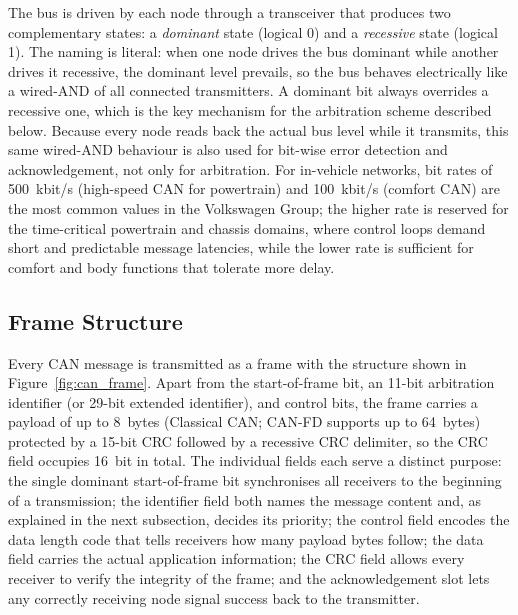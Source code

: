 \documentclass[11pt,a4paper,oneside,parskip=half]{scrreprt}
\begin{document}
The bus is driven by each node through a transceiver that produces two complementary states: a \textit{dominant} state (logical 0) and a \textit{recessive} state (logical 1). The naming is literal: when one node drives the bus dominant while another drives it recessive, the dominant level prevails, so the bus behaves electrically like a wired-AND of all connected transmitters. A dominant bit always overrides a recessive one, which is the key mechanism for the arbitration scheme described below. Because every node reads back the actual bus level while it transmits, this same wired-AND behaviour is also used for bit-wise error detection and acknowledgement, not only for arbitration. For in-vehicle networks, bit rates of 500~kbit/s (high-speed CAN for powertrain) and 100~kbit/s (comfort CAN) are the most common values in the Volkswagen Group; the higher rate is reserved for the time-critical powertrain and chassis domains, where control loops demand short and predictable message latencies, while the lower rate is sufficient for comfort and body functions that tolerate more delay.

\subsection{Frame Structure}
Every CAN message is transmitted as a frame with the structure shown in Figure~\ref{fig:can_frame}. Apart from the start-of-frame bit, an 11-bit arbitration identifier (or 29-bit extended identifier), and control bits, the frame carries a payload of up to 8~bytes (Classical CAN; CAN-FD supports up to 64~bytes) protected by a 15-bit CRC followed by a recessive CRC delimiter, so the CRC field occupies 16~bit in total. The individual fields each serve a distinct purpose: the single dominant start-of-frame bit synchronises all receivers to the beginning of a transmission; the identifier field both names the message content and, as explained in the next subsection, decides its priority; the control field encodes the data length code that tells receivers how many payload bytes follow; the data field carries the actual application information; the CRC field allows every receiver to verify the integrity of the frame; and the acknowledgement slot lets any correctly receiving node signal success back to the transmitter.
\end{document}
